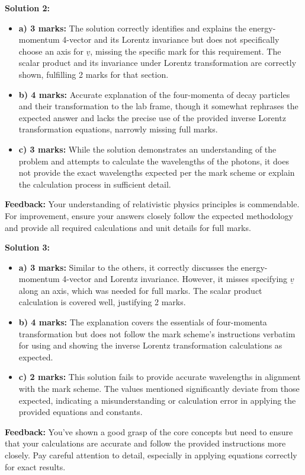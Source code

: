 \documentclass[a4paper,11pt]{article}
\begin{document}
\textbf{Solution 2:}
\begin{itemize}
    \item \textbf{a) 3 marks:} The solution correctly identifies and explains the energy-momentum 4-vector and its Lorentz invariance but does not specifically choose an axis for \( \underline{v} \), missing the specific mark for this requirement. The scalar product and its invariance under Lorentz transformation are correctly shown, fulfilling 2 marks for that section.
    \item \textbf{b) 4 marks:} Accurate explanation of the four-momenta of decay particles and their transformation to the lab frame, though it somewhat rephrases the expected answer and lacks the precise use of the provided inverse Lorentz transformation equations, narrowly missing full marks.
    \item \textbf{c) 3 marks:} While the solution demonstrates an understanding of the problem and attempts to calculate the wavelengths of the photons, it does not provide the exact wavelengths expected per the mark scheme or explain the calculation process in sufficient detail.
\end{itemize}
\textbf{Feedback:} Your understanding of relativistic physics principles is commendable. For improvement, ensure your answers closely follow the expected methodology and provide all required calculations and unit details for full marks.

\textbf{Solution 3:}
\begin{itemize}
    \item \textbf{a) 3 marks:} Similar to the others, it correctly discusses the energy-momentum 4-vector and Lorentz invariance. However, it misses specifying \( \underline{v} \) along an axis, which was needed for full marks. The scalar product calculation is covered well, justifying 2 marks.
    \item \textbf{b) 4 marks:} The explanation covers the essentials of four-momenta transformation but does not follow the mark scheme's instructions verbatim for using and showing the inverse Lorentz transformation calculations as expected.
    \item \textbf{c) 2 marks:} This solution fails to provide accurate wavelengths in alignment with the mark scheme. The values mentioned significantly deviate from those expected, indicating a misunderstanding or calculation error in applying the provided equations and constants.
\end{itemize}
\textbf{Feedback:} You've shown a good grasp of the core concepts but need to ensure that your calculations are accurate and follow the provided instructions more closely. Pay careful attention to detail, especially in applying equations correctly for exact results.
\end{document}
